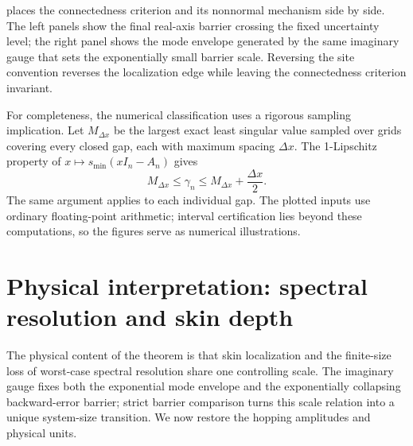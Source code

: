 \documentclass[12pt,anonymous]{iopjournal}
\numberwithin{equation}{section}
\theoremstyle{remark}
\begin{document}
 places the connectedness criterion and its nonnormal
mechanism side by side.  The left panels show the final real-axis barrier
crossing the fixed uncertainty level; the right panel shows the mode
envelope generated by the same imaginary gauge that sets the exponentially
small barrier scale.  Reversing the site convention reverses the localization
edge while leaving the connectedness criterion invariant.

For completeness, the numerical classification uses a rigorous sampling
implication.  Let \(M_{\Delta x}\) be the largest exact least singular value
sampled over grids covering every closed gap, each with maximum spacing
\(\Delta x\).  The 1-Lipschitz property of
\(x\mapsto s_{\min}(xI_n-A_n)\) gives
\[
 M_{\Delta x}\leq\gamma_n\leq
 M_{\Delta x}+\frac{\Delta x}{2}.
\]
The same argument applies to each individual gap.  The plotted inputs use
ordinary floating-point arithmetic; interval certification lies beyond
these computations, so the figures serve as numerical illustrations.

\FloatBarrier

\section{Physical interpretation: spectral resolution and skin depth}
\label{sec:physical-conclusion}

The physical content of the theorem is that skin localization and the
finite-size loss of worst-case spectral resolution share one controlling
scale.  The imaginary gauge fixes both the exponential mode envelope and
the exponentially collapsing backward-error barrier; strict barrier
comparison turns this scale relation into a unique system-size transition.
We now restore the hopping amplitudes and physical units.
\end{document}
